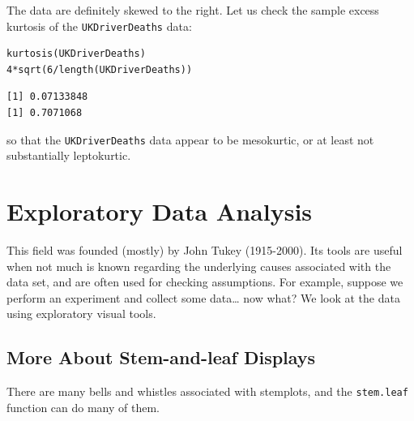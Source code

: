 \documentclass[10pt,english]{scrbook}
\begin{document}
The data are definitely skewed to the right. Let us check the sample excess kurtosis of the \texttt{UKDriverDeaths} data:

\begin{verbatim}
kurtosis(UKDriverDeaths)
4*sqrt(6/length(UKDriverDeaths))
\end{verbatim}

\begin{verbatim}
[1] 0.07133848
[1] 0.7071068
\end{verbatim}

so that the \texttt{UKDriverDeaths} data appear to be mesokurtic, or at least not substantially leptokurtic.
\section[Exploratory Data Analysis]{Exploratory Data Analysis}
\label{sec-1-4}

This field was founded (mostly) by John Tukey (1915-2000). Its tools are useful when not much is known regarding the underlying causes associated with the data set, and are often used for checking assumptions. For example, suppose we perform an experiment and collect some data\ldots{} now what? We look at the data using exploratory visual tools.

\subsection[More About Stem-and-leaf Displays]{More About Stem-and-leaf Displays}
\label{sec-1-4-1}

There are many bells and whistles associated with stemplots, and the \texttt{stem.leaf} function can do many of them.
\end{document}
